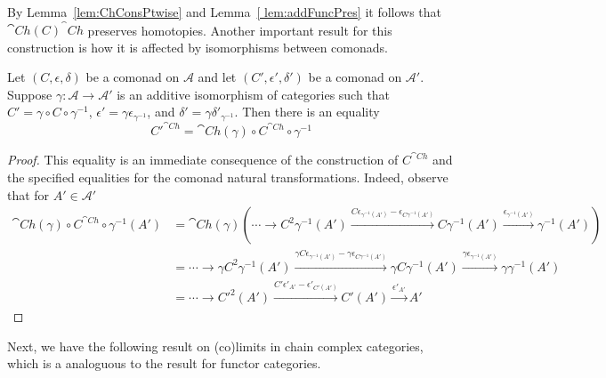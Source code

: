 By Lemma~\ref{lem:ChConsPtwise} and Lemma~\ref{ lem:addFuncPres} it follows that $\cat{Ch}(C)^\cat{Ch}$ preserves homotopies. Another important result for this construction is how it is affected by isomorphisms between comonads.

\begin{lem}[label=lem:ChComIso]
    Let $(C,\epsilon,\delta)$ be a comonad on $\mathcal{A}$ and let $(C',\epsilon',\delta')$ be a comonad on $\mathcal{A}'$. Suppose $\gamma:\mathcal{A}\to \mathcal{A}'$ is an additive isomorphism of categories such that $C' = \gamma\circ C\circ \gamma^{-1}$, $\epsilon' = \gamma\epsilon_{\gamma^{-1}}$, and $\delta' = \gamma\delta'_{\gamma^{-1}}$. Then there is an equality
    \begin{equation*}
        {C'}^{\cat{Ch}} = \cat{Ch}(\gamma)\circ C^{\cat{Ch}}\circ \gamma^{-1}
    \end{equation*}
\end{lem}
\begin{proof}
    This equality is an immediate consequence of the construction of $C^{\cat{Ch}}$ and the specified equalities for the comonad natural transformations. Indeed, observe that for $A' \in \mathcal{A}'$
    \begin{align*}
        \cat{Ch}(\gamma)\circ C^{\cat{Ch}}\circ \gamma^{-1}(A') &= \cat{Ch}(\gamma)(\cdots \to C^2\gamma^{-1}(A')\xrightarrow{C\epsilon_{\gamma^{-1}(A')}-\epsilon_{C\gamma^{-1}(A')}}C\gamma^{-1}(A')\xrightarrow{\epsilon_{\gamma^{-1}(A')}}\gamma^{-1}(A')) \\
        &= \cdots \to \gamma C^2\gamma^{-1}(A')\xrightarrow{\gamma C\epsilon_{\gamma^{-1}(A')}-\gamma \epsilon_{C\gamma^{-1}(A')}}\gamma C\gamma^{-1}(A')\xrightarrow{\gamma \epsilon_{\gamma^{-1}(A')}}\gamma \gamma^{-1}(A') \\
        &= \cdots \to {C'}^2(A')\xrightarrow{C'\epsilon'_{A'}-\epsilon'_{C'(A')}}C'(A')\xrightarrow{\epsilon'_{A'}}A'
    \end{align*}
\end{proof}


Next, we have the following result on (co)limits in chain complex categories, which is a analoguous to the result for functor categories.

